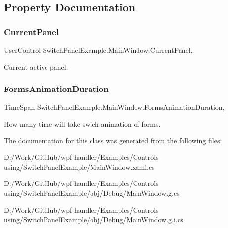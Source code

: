 \subsection{Property Documentation}
\mbox{\label{class_switch_panel_example_1_1_main_window_aa22477560029b6d618de4024b1342342}} 
\subsubsection{\texorpdfstring{Current\+Panel}{CurrentPanel}}
{\footnotesize\ttfamily User\+Control Switch\+Panel\+Example.\+Main\+Window.\+Current\+Panel\hspace{0.3cm}{\ttfamily [get]}, {\ttfamily [set]}}



Current active panel. 

\mbox{\label{class_switch_panel_example_1_1_main_window_a05a9a158b92306ba73dbad36d7ed2fa8}} 
\subsubsection{\texorpdfstring{Forms\+Animation\+Duration}{FormsAnimationDuration}}
{\footnotesize\ttfamily Time\+Span Switch\+Panel\+Example.\+Main\+Window.\+Forms\+Animation\+Duration\hspace{0.3cm}{\ttfamily [get]}, {\ttfamily [set]}}



How many time will take swich animation of forms. 



The documentation for this class was generated from the following files\+:\begin{DoxyCompactItemize}
\item 
D\+:/\+Work/\+Git\+Hub/wpf-\/handler/\+Examples/\+Controls using/\+Switch\+Panel\+Example/Main\+Window.\+xaml.\+cs\item 
D\+:/\+Work/\+Git\+Hub/wpf-\/handler/\+Examples/\+Controls using/\+Switch\+Panel\+Example/obj/\+Debug/Main\+Window.\+g.\+cs\item 
D\+:/\+Work/\+Git\+Hub/wpf-\/handler/\+Examples/\+Controls using/\+Switch\+Panel\+Example/obj/\+Debug/Main\+Window.\+g.\+i.\+cs\end{DoxyCompactItemize}
